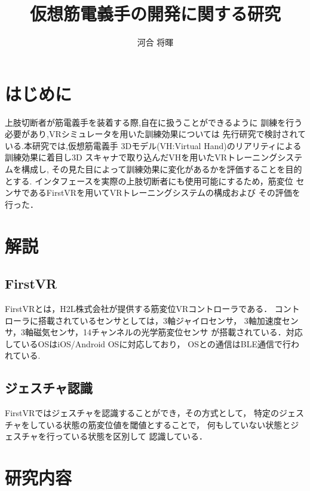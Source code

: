 \documentclass{ltjsarticle}
\title{仮想筋電義手の開発に関する研究}
\author{河合 将暉}
\begin{document}
\maketitle

\section{はじめに}
	上肢切断者が筋電義手を装着する際,自在に扱うことができるように
	訓練を行う必要があり,VRシミュレータを用いた訓練効果については
	先行研究\cite{ref:1}で検討されている.本研究では,仮想筋電義手
	3Dモデル(VH:Virtual Hand)のリアリティによる訓練効果に着目し3D
	スキャナで取り込んだVHを用いたVRトレーニングシステムを構成し,
	その見た目によって訓練効果に変化があるかを評価することを目的とする.
	インタフェースを実際の上肢切断者にも使用可能にするため，筋変位
	センサであるFirstVRを用いてVRトレーニングシステムの構成および
	その評価を行った．
\section{解説}
	\subsection{FirstVR}
		FirstVR\cite{ref:2}とは，H2L株式会社が提供する筋変位VRコントローラである．
		コントローラに搭載されているセンサとしては，3軸ジャイロセンサ，
		3軸加速度センサ，3軸磁気センサ，14チャンネルの光学筋変位センサ
		が搭載されている．対応しているOSはiOS/Android OSに対応しており，
		OSとの通信はBLE通信で行われている.

	\subsection{ジェスチャ認識}
		FirstVRではジェスチャを認識することができ，その方式として，
		特定のジェスチャをしている状態の筋変位値を閾値とすることで，
		何もしていない状態とジェスチャを行っている状態を区別して
		認識している．

\section{研究内容}
\end{document}
